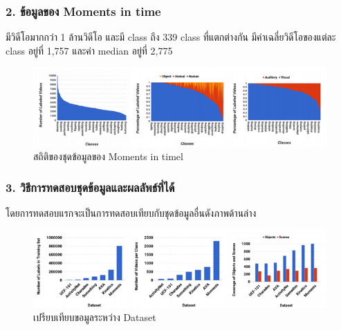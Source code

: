 \subsubsection*{2. ข้อมูลของ Moments in time}
มีวิดีโอมากกว่า 1 ล้านวิดีโอ และมี class ถึง 339 class ที่แตกต่างกัน มีค่าเฉลี่ยวิดีโอของแต่ละ class อยู่ที่ 1,757 และค่า median อยู่ที่ 2,775

\begin{figure}[!ht]
	\centering
	\includegraphics[width=1\textwidth]{chapter2/images/statistic_moment.png}
		\caption{สถิติของชุดข้อมูลของ Moments in timel}
    	\label{fig:statistic_moment}
\end{figure}
\subsubsection*{3. วิธีการทดสอบชุดข้อมูลและผลลัพธ์ที่ได้}
โดยการทดสอบแรกจะเป็นการทดสอบเทียบกับชุดข้อมูลอื่นดังภาพด้านล่าง

\begin{figure}[!ht]
	\centering
	\includegraphics[width=1\textwidth]{chapter2/images/compare_dataset.png}
		\caption{เปรียบเทียบขอมูลระหว่าง Dataset}
    	\label{fig:compare_dataset}
\end{figure}

